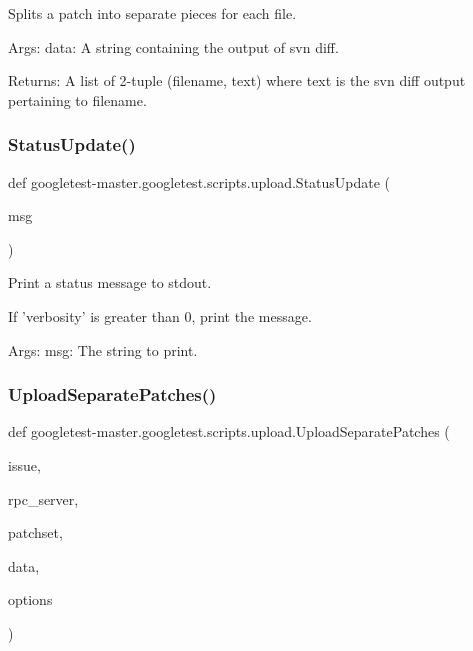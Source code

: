 \begin{DoxyVerb}Splits a patch into separate pieces for each file.

Args:
  data: A string containing the output of svn diff.

Returns:
  A list of 2-tuple (filename, text) where text is the svn diff output
    pertaining to filename.
\end{DoxyVerb}
 \mbox{\label{namespacegoogletest-master_1_1googletest_1_1scripts_1_1upload_a48cc0bb2a658b795c535a98493208ebb}} 
\subsubsection{\texorpdfstring{StatusUpdate()}{StatusUpdate()}}
{\footnotesize\ttfamily def googletest-\/master.\+googletest.\+scripts.\+upload.\+Status\+Update (\begin{DoxyParamCaption}\item[{}]{msg }\end{DoxyParamCaption})}

\begin{DoxyVerb}Print a status message to stdout.

If 'verbosity' is greater than 0, print the message.

Args:
  msg: The string to print.
\end{DoxyVerb}
 \mbox{\label{namespacegoogletest-master_1_1googletest_1_1scripts_1_1upload_a90629394429ff90c2d4942ea52467426}} 
\subsubsection{\texorpdfstring{UploadSeparatePatches()}{UploadSeparatePatches()}}
{\footnotesize\ttfamily def googletest-\/master.\+googletest.\+scripts.\+upload.\+Upload\+Separate\+Patches (\begin{DoxyParamCaption}\item[{}]{issue,  }\item[{}]{rpc\+\_\+server,  }\item[{}]{patchset,  }\item[{}]{data,  }\item[{}]{options }\end{DoxyParamCaption})}

